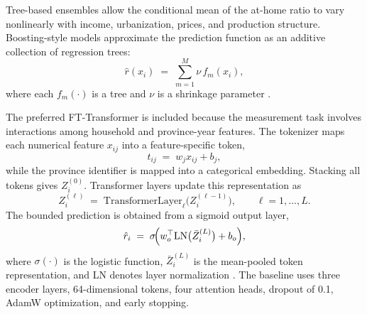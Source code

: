 \documentclass[preprint,12pt,authoryear]{elsarticle}
\begin{document}
Tree-based ensembles allow the conditional mean of the at-home ratio to vary nonlinearly with income, urbanization, prices, and production structure. Boosting-style models approximate the prediction function as an additive collection of regression trees:
\begin{equation}
\hat{r}(x_i) \;=\; \sum_{m=1}^{M}\nu\,f_m(x_i),
\label{eq:boost}
\end{equation}
where each $f_m(\cdot)$ is a tree and $\nu$ is a shrinkage parameter \citep{Breiman2001, ChenGuestrin2016, KeEtAl2017, ProkhorenkovaEtAl2018}.

The preferred FT-Transformer is included because the measurement task involves interactions among household and province-year features. The tokenizer maps each numerical feature $x_{ij}$ into a feature-specific token,
\begin{equation}
t_{ij} \;=\; w_j x_{ij} + b_j,
\label{eq:token}
\end{equation}
while the province identifier is mapped into a categorical embedding. Stacking all tokens gives $Z_i^{(0)}$. Transformer layers update this representation as
\begin{equation}
Z_i^{(\ell)} \;=\; \mathrm{TransformerLayer}_\ell\!\bigl(Z_i^{(\ell-1)}\bigr), \qquad \ell=1,\dots,L.
\label{eq:transformer}
\end{equation}
The bounded prediction is obtained from a sigmoid output layer,
\begin{equation}
\hat{r}_i \;=\; \sigma\!\Bigl(w_o^\top \mathrm{LN}\bigl(\bar{Z}_i^{(L)}\bigr) + b_o\Bigr),
\label{eq:ftout}
\end{equation}
where $\sigma(\cdot)$ is the logistic function, $\bar{Z}_i^{(L)}$ is the mean-pooled token representation, and LN denotes layer normalization \citep{GoodfellowEtAl2016, GorishniyEtAl2021, RubachevEtAl2024}. The baseline uses three encoder layers, 64-dimensional tokens, four attention heads, dropout of 0.1, AdamW optimization, and early stopping.
\end{document}
